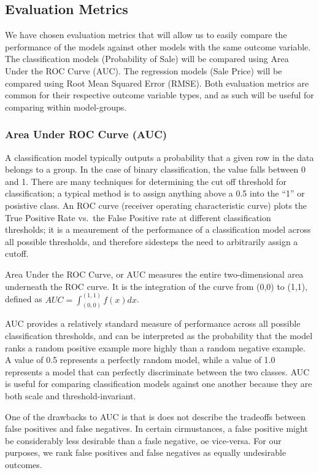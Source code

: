 \documentclass[]{article}
\begin{document}
\subsection{Evaluation Metrics}\label{evaluation-metrics}

We have chosen evaluation metrics that will allow us to easily compare
the performance of the models against other models with the same outcome
variable. The classification models (Probability of Sale) will be
compared using Area Under the ROC Curve (AUC). The regression models
(Sale Price) will be compared using Root Mean Squared Error (RMSE). Both
evaluation metrics are common for their respective outcome variable
types, and as such will be useful for comparing within model-groups.

\subsubsection{Area Under ROC Curve
(AUC)}\label{area-under-roc-curve-auc}

A classification model typically outputs a probability that a given row
in the data belongs to a group. In the case of binary classification,
the value falls between 0 and 1. There are many techniques for
determining the cut off threshold for classification; a typical method
is to assign anything above a 0.5 into the ``1'' or posistive class. An
ROC curve (receiver operating characteristic curve) plots the True
Positive Rate vs.~the False Positive rate at different classification
thresholds; it is a meaurement of the performance of a classification
model across all possible thresholds, and therefore sidesteps the need
to arbitrarily assign a cutoff.

Area Under the ROC Curve, or AUC measures the entire two-dimensional
area underneath the ROC curve. It is the integration of the curve from
(0,0) to (1,1), defined as \(AUC = \int_{(0,0)}^{(1,1)} f(x)dx\).

AUC provides a relatively standard measure of performance across all
possible classification thresholds, and can be interpreted as the
probability that the model ranks a random positive example more highly
than a random negative example. A value of 0.5 represents a perfectly
random model, while a value of 1.0 represents a model that can perfectly
discriminate between the two classes. AUC is useful for comparing
classification models against one another because they are both scale
and threshold-invariant.

One of the drawbacks to AUC is that is does not describe the tradeoffs
between false positives and false negatives. In certain cirmustances, a
false positive might be considerably less desirable than a fasle
negative, oe vice-versa. For our purposes, we rank false positives and
false negatives as equally undesirable outcomes.
\end{document}

